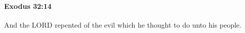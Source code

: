 
		\paragraph{Exodus 32:14} %
			\label{EXODUS-32-14}

			And the LORD repented of the evil which he thought to do unto his people.


